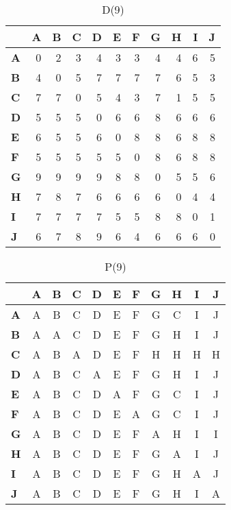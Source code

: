 \documentclass{article}
\begin{document}
\begin{table}[H]\centering
\caption{D(9)}
\begin{tabular}{l r r r r r r r r r r}
\toprule
 & \textbf{A} & \textbf{B} & \textbf{C} & \textbf{D} & \textbf{E} & \textbf{F} & \textbf{G} & \textbf{H} & \textbf{I} & \textbf{J}\\\midrule
\textbf{A} & 0 & 2 & 3 & 4 & 3 & 3 & 4 & 4 & 6 & 5 \\
\textbf{B} & 4 & 0 & 5 & 7 & 7 & 7 & 7 & 6 & 5 & 3 \\
\textbf{C} & 7 & 7 & 0 & 5 & 4 & 3 & 7 & 1 & 5 & 5 \\
\textbf{D} & 5 & 5 & 5 & 0 & 6 & 6 & 8 & 6 & 6 & 6 \\
\textbf{E} & 6 & 5 & 5 & 6 & 0 & 8 & 8 & 6 & 8 & 8 \\
\textbf{F} & 5 & 5 & 5 & 5 & 5 & 0 & 8 & 6 & 8 & 8 \\
\textbf{G} & 9 & 9 & 9 & 9 & 8 & 8 & 0 & 5 & 5 & \cellcolor{yellow!30}6 \\
\textbf{H} & 7 & 8 & 7 & 6 & 6 & 6 & 6 & 0 & 4 & 4 \\
\textbf{I} & 7 & 7 & 7 & 7 & 5 & 5 & 8 & 8 & 0 & 1 \\
\textbf{J} & 6 & 7 & 8 & 9 & 6 & 4 & 6 & 6 & 6 & 0 \\
\bottomrule
\end{tabular}
\end{table}

\begin{table}[H]\centering
\caption{P(9)}
\begin{tabular}{l c c c c c c c c c c}
\toprule
 & \textbf{A} & \textbf{B} & \textbf{C} & \textbf{D} & \textbf{E} & \textbf{F} & \textbf{G} & \textbf{H} & \textbf{I} & \textbf{J}\\\midrule
\textbf{A} & A & B & C & D & E & F & G & C & I & J \\
\textbf{B} & A & A & C & D & E & F & G & H & I & J \\
\textbf{C} & A & B & A & D & E & F & H & H & H & H \\
\textbf{D} & A & B & C & A & E & F & G & H & I & J \\
\textbf{E} & A & B & C & D & A & F & G & C & I & J \\
\textbf{F} & A & B & C & D & E & A & G & C & I & J \\
\textbf{G} & A & B & C & D & E & F & A & H & I & \cellcolor{yellow!30}I \\
\textbf{H} & A & B & C & D & E & F & G & A & I & J \\
\textbf{I} & A & B & C & D & E & F & G & H & A & J \\
\textbf{J} & A & B & C & D & E & F & G & H & I & A \\
\bottomrule
\end{tabular}
\end{table}
\end{document}
